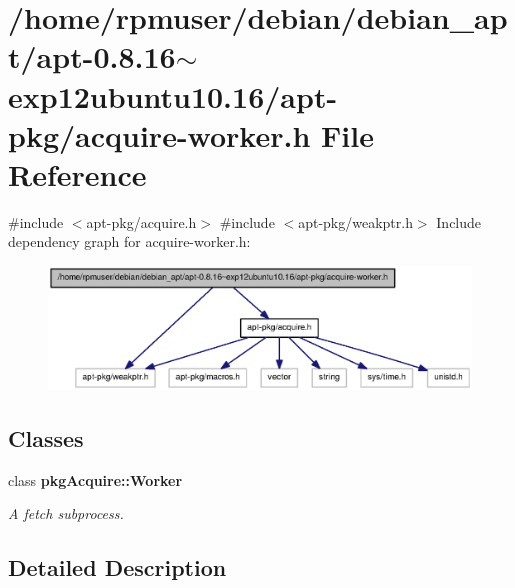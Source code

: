 \section{/home/rpmuser/debian/debian\-\_\-apt/apt-\/0.8.16$\sim$exp12ubuntu10.16/apt-\/pkg/acquire-\/worker.h \-File \-Reference}
\label{acquire-worker_8h}
{\ttfamily \#include $<$apt-\/pkg/acquire.\-h$>$}\*
{\ttfamily \#include $<$apt-\/pkg/weakptr.\-h$>$}\*
\-Include dependency graph for acquire-\/worker.h\-:
\nopagebreak
\begin{figure}[H]
\begin{center}
\leavevmode
\includegraphics[width=350pt]{acquire-worker_8h__incl}
\end{center}
\end{figure}
\subsection*{\-Classes}
\begin{DoxyCompactItemize}
\item 
class {\bf pkg\-Acquire\-::\-Worker}
\begin{DoxyCompactList}\small\item\em \-A fetch subprocess. \end{DoxyCompactList}\end{DoxyCompactItemize}


\subsection{\-Detailed \-Description}
